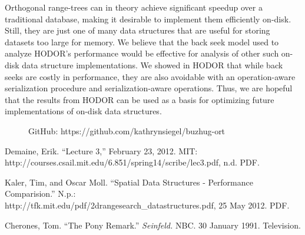 \documentclass[11pt, oneside]{article}
\begin{document}
Orthogonal range-trees can in theory achieve significant speedup over a
traditional database, making it desirable to implement them efficiently on-disk.
Still, they are just one of many data structures that are useful for storing
datasets too large for memory. We believe that the back seek model used to
analyze HODOR's performance would be effective for analysis of other such
on-disk data structure implementations. We showed in HODOR that while back seeks
are costly in performance, they are also avoidable with an operation-aware
serialization procedure and serialization-aware operations. Thus, we are hopeful
that the results from HODOR can be used as a basis for optimizing future
implementations of on-disk data structures. 

\begin{figure}[b]
    GitHub: https://github.com/kathrynsiegel/buzhug-ort
\end{figure}

\newpage

\begin{thebibliography}{1}
    
     Demaine, Erik. ``Lecture 3,'' February 23, 2012.  MIT: \\
        http://courses.csail.mit.edu/6.851/spring14/scribe/lec3.pdf, n.d. PDF.

     Kaler, Tim, and Oscar Moll. ``Spatial Data Structures -
        Performance Comparision.'' N.p.: \\
        http://tfk.mit.edu/pdf/2drangesearch\_datastructures.pdf, 25 May 2012.
        PDF.

     Cherones, Tom. ``The Pony Remark.'' \textit{Seinfeld.}
        NBC. 30 January 1991. Television.

\end{thebibliography}
\end{document}
